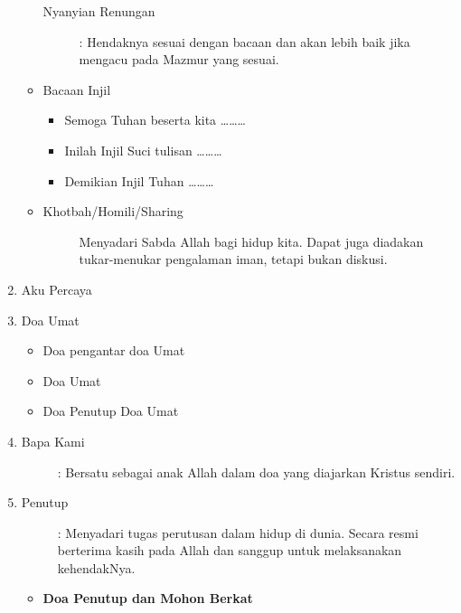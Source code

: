 \begin{enumerate}
\begin{itemize}
\begin{description}
\item[Nyanyian Renungan]: Hendaknya sesuai dengan bacaan dan akan lebih baik jika mengacu pada Mazmur yang sesuai. 
\end{description}
\item \begin{description}
\item[Bacaan Injil]
\end{description}

\begin{itemize}
\item Semoga Tuhan beserta kita {\dots}{\dots}{\dots}
\item Inilah Injil Suci tulisan {\dots}{\dots}{\dots}
\item Demikian Injil Tuhan {\dots}{\dots}{\dots}
\end{itemize}
\item \begin{description}
\item[Khotbah/Homili/Sharing]

Menyadari Sabda Allah bagi hidup kita. Dapat juga diadakan tukar-menukar
pengalaman iman, tetapi bukan diskusi.

\end{description}
\end{itemize}
\item \begin{description}
\item[Aku Percaya]
\end{description}
\item \begin{description}
\item[Doa Umat ]
\end{description}
\begin{itemize}
\item Doa pengantar doa Umat 
\item Doa Umat
\item Doa Penutup Doa Umat
\end{itemize}

\item \begin{description}
\item[Bapa Kami]: Bersatu sebagai anak Allah dalam doa yang diajarkan
Kristus sendiri.
\end{description}
\item \begin{description}
\item[Penutup] : Menyadari tugas perutusan dalam hidup di dunia. Secara
resmi berterima kasih pada Allah dan sanggup untuk melaksanakan
kehendakNya.
\end{description}
 \begin{itemize}
\item \textbf{Doa Penutup dan Mohon Berkat}


\end{itemize}
\end{enumerate}
